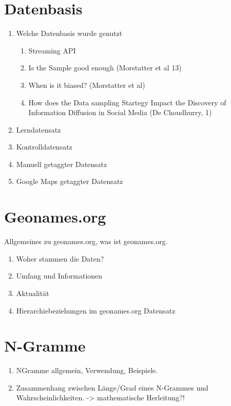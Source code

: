 	\section{Datenbasis}
		\begin{enumerate}
			\item Welche Datenbasis wurde genutzt 
				\begin{enumerate}
					\item Streaming API
					\item Is the Sample good enough (Morstatter et al 13)
					\item When is it biased? (Morstatter et al)
					\item How does the Data sampling Startegy Impact the Discovery of Information Diffusion in Social Media (De Choudhurry, 1)
				\end{enumerate}
			\item Lerndatensatz
			\item Kontrolldatensatz
			\item Manuell getaggter Datensatz
			\item Google Maps getaggter Datensatz
		\end{enumerate}			
	
	\section{Geonames.org}
		Allgemeines zu geonames.org, was ist geonames.org. 
		\begin{enumerate}
			\item Woher stammen die Daten?
			\item Umfang und Informationen
			\item Aktualität
			\item Hierarchiebeziehungen im geonames.org Datensatz

		\end{enumerate}			


	\section{N-Gramme}
		\begin{enumerate}
			\item NGramme allgemein, Verwendung, Beispiele. 
			\item {} Zusammenhang zwischen Länge/Grad eines N-Grammes und Wahrscheinlichkeiten. -> mathematische Herleitung?!
		\end{enumerate}

